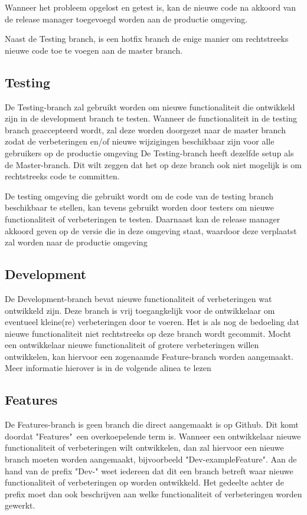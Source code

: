 	Wanneer het probleem opgelost en getest is, kan de nieuwe code na akkoord van de release manager toegevoegd worden aan de productie omgeving.
	
	Naast de Testing branch, is een hotfix branch de enige manier om rechtstreeks nieuwe code toe te voegen aan de master branch.
	
	\subsection{Testing}
	De Testing-branch zal gebruikt worden om nieuwe functionaliteit die ontwikkeld zijn in de development branch te testen. Wanneer de functionaliteit in de testing branch geaccepteerd wordt, zal deze worden doorgezet naar de master branch zodat de verbeteringen en/of nieuwe wijzigingen beschikbaar zijn voor alle gebruikers op de productie omgeving
	De Testing-branch heeft dezelfde setup als de Master-branch. Dit wilt zeggen dat het op deze branch ook niet mogelijk is om rechtstreeks code te committen.
	
	De testing omgeving die gebruikt wordt om de code van de testing branch beschikbaar te stellen, kan tevens gebruikt worden door testers om nieuwe functionaliteit of verbeteringen te testen. Daarnaast kan de release manager akkoord geven op de versie die in deze omgeving staat, waardoor deze verplaatst zal worden naar de productie omgeving
	\subsection{Development}
	
	De Development-branch bevat nieuwe functionaliteit of verbeteringen wat ontwikkeld zijn. Deze branch is vrij toegangkelijk voor de ontwikkelaar om eventueel kleine(re) verbeteringen door te voeren.	
	Het is als nog de bedoeling dat nieuwe functionaliteit niet rechtstreeks op deze branch wordt gecommit. Mocht een ontwikkelaar nieuwe functionaliteit of grotere verbeteringen willen ontwikkelen, kan hiervoor een zogenaamde Feature-branch worden aangemaakt. Meer informatie hierover is in de volgende alinea te lezen
	
	\subsection{Features}
	De Features-branch is geen branch die direct aangemaakt is op Github. Dit komt doordat "Features"\ een overkoepelende term is. Wanneer een ontwikkelaar nieuwe functionaliteit of verbeteringen wilt ontwikkelen, dan zal hiervoor een nieuwe branch moeten worden aangemaakt, bijvoorbeeld "Dev-exampleFeature". Aan de hand van de prefix "Dev-" weet iedereen dat dit een branch betreft waar nieuwe functionaliteit of verbeteringen op worden ontwikkeld. Het gedeelte achter de prefix moet dan ook beschrijven aan welke functionaliteit of verbeteringen worden gewerkt.
	
